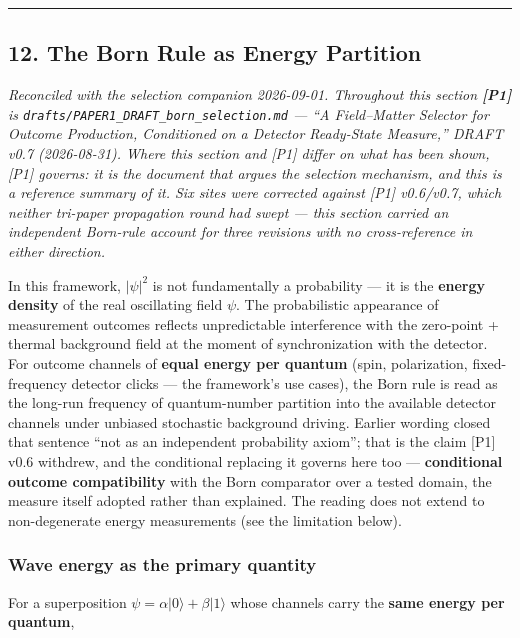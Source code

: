 \documentclass[
]{article}
\begin{document}
\begin{center}\rule{0.5\linewidth}{0.5pt}\end{center}

\subsection{12. The Born Rule as Energy
Partition}\label{the-born-rule-as-energy-partition}

\emph{Reconciled with the selection companion 2026-09-01. Throughout
this section \textbf{{[}P1{]}} is
\texttt{drafts/PAPER1\_DRAFT\_born\_selection.md} --- ``A Field--Matter
Selector for Outcome Production, Conditioned on a Detector Ready-State
Measure,'' DRAFT v0.7 (2026-08-31). Where this section and {[}P1{]}
differ on what has been shown, {[}P1{]} governs: it is the document that
argues the selection mechanism, and this is a reference summary of it.
Six sites were corrected against {[}P1{]} v0.6/v0.7, which neither
tri-paper propagation round had swept --- this section carried an
independent Born-rule account for three revisions with no
cross-reference in either direction.}

In this framework, \(|\psi|^2\) is not fundamentally a probability ---
it is the \textbf{energy density} of the real oscillating field
\(\psi\). The probabilistic appearance of measurement outcomes reflects
unpredictable interference with the zero-point + thermal background
field at the moment of synchronization with the detector. For outcome
channels of \textbf{equal energy per quantum} (spin, polarization,
fixed-frequency detector clicks --- the framework's use cases), the Born
rule is read as the long-run frequency of quantum-number partition into
the available detector channels under unbiased stochastic background
driving. Earlier wording closed that sentence ``not as an independent
probability axiom''; that is the claim {[}P1{]} v0.6 withdrew, and the
conditional replacing it governs here too --- \textbf{conditional
outcome compatibility} with the Born comparator over a tested domain,
the measure itself adopted rather than explained. The reading does not
extend to non-degenerate energy measurements (see the limitation below).

\subsubsection{Wave energy as the primary
quantity}\label{wave-energy-as-the-primary-quantity}

For a superposition \(\psi = \alpha|0\rangle + \beta|1\rangle\) whose
channels carry the \textbf{same energy per quantum},
\end{document}
